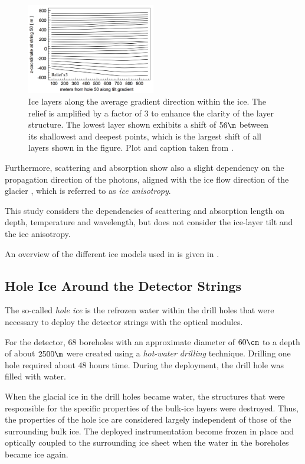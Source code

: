 \begin{figure}[htbp]
  \centering
  \includegraphics[width=0.5\textwidth]{img/icepaper-fig-14-layers}
  \caption{Ice layers along the average gradient direction within the ice. The relief is amplified by a factor of 3 to enhance the clarity of the layer structure. The lowest layer shown exhibits a shift of $56\m$ between its shallowest and deepest points, which is the largest shift of all layers shown in the figure. Plot and caption taken from \cite[figure 14]{icepaper}.}
  \label{fig:wohr8uaY}
\end{figure}

Furthermore, scattering and absorption show also a slight dependency on the propagation direction of the photons, aligned with the ice flow direction of the glacier \cite{icrc17pocam}, which is referred to as \textit{ice anisotropy}.

This study considers the dependencies of scattering and absorption length on depth, temperature and wavelength, but does not consider the ice-layer tilt and the ice anisotropy.

An overview of the different ice models used in \icecube is given in \cite{flasherdataderivedicemodels}.


\subsection{Hole Ice Around the Detector Strings}
\label{sec:hole_ice}

The so-called \textit{hole ice} is the refrozen water within the drill holes that were necessary to deploy the detector strings with the optical modules.

For the \icecube detector, 68 boreholes with an approximate diameter of $60\cm$ to a depth of about $2500\m$ were created using a \textit{hot-water drilling} technique. Drilling one hole required about 48 hours time. During the deployment, the drill hole was filled with water. \cite{instrumentation}

When the glacial ice in the drill holes became water, the structures that were responsible for the specific properties of the bulk-ice layers were destroyed. Thus, the properties of the hole ice are considered largely independent of those of the surrounding bulk ice. The deployed instrumentation become frozen in place and optically coupled to the surrounding ice sheet when the water in the boreholes became ice again. \cite{instrumentation}

